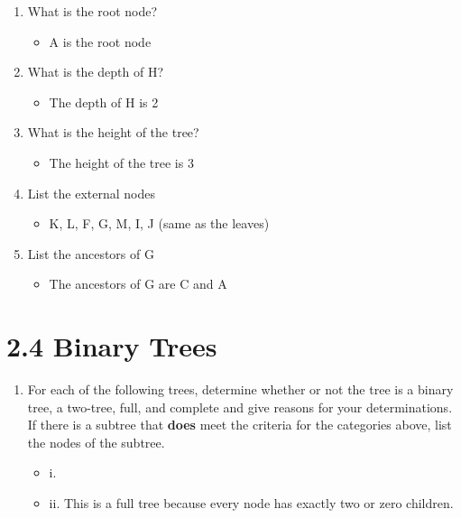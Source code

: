 \documentclass[11pt]{article}
\begin{document}
\begin{enumerate}
    \item What is the root node?
    \begin{itemize}
        \item A is the root node
    \end{itemize}
    
    \item What is the depth of H?
    \begin{itemize}
        \item The depth of H is 2
    \end{itemize}
    
    \item What is the height of the tree?
    \begin{itemize}
        \item The height of the tree is 3
    \end{itemize}
    
    \item List the external nodes
    \begin{itemize}
        \item K, L, F, G, M, I, J (same as the leaves)
    \end{itemize}
    
    \item List the ancestors of G
    \begin{itemize}
        \item The ancestors of G are C and A
    \end{itemize}
    
\end{enumerate}

\section*{2.4 Binary Trees}
\begin{enumerate}
    \item For each of the following trees, determine whether or not the tree is a binary tree, a two-tree, full, and complete and give reasons for your determinations. If there is a subtree that \textbf{does} meet the criteria for the categories above, list the nodes of the subtree.
    \begin{itemize}
        \item i.  
        \item ii. This is a full tree because every node has exactly two or zero children.
    \end{itemize}
    
\end{enumerate}
\end{document}
